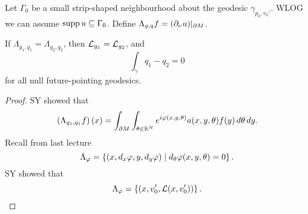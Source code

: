 Let $\Gamma_0$ be a small strip-shaped neighbourhood about the geodesic $\gamma_{p_0,v_0'}$.
WLOG we can assume $\operatorname{supp} u\subseteq\Gamma_0$.
Define $\Lambda_{g,q}f=(\partial_\nu u)|_{\partial M}$.

\begin{thm}
  If $\Lambda_{g_1,q_1}=\Lambda_{g_2,q_2}$, then $\mathcal{L}_{g_1}=\mathcal{L}_{g_2}$, and
  \[ \int_\gamma q_1-q_2=0 \]
  for all null future-pointing geodesics.
\end{thm}

\begin{proof}
  SY showed that
  \[ \left( \Lambda_{g_1,q_1}f \right)(x) = \int_{\partial M} \int_{\theta\in\mathbb{R}^N} e^{i\varphi(x,y,\theta)} a(x,y,\theta) f(y) \, d\theta \, dy. \]
  Recall from last lecture
  \[ \Lambda_\varphi = \left\{ (x,d_x\varphi,y,d_y\varphi) \mid d_\theta\varphi(x,y,\theta)=0 \right\}. \]
  SY showed that
  \[ \Lambda_\varphi = \left\{ (x,v_0',\mathcal{L}(x,v_0')) \right\}. \qedhere \]
\end{proof}
